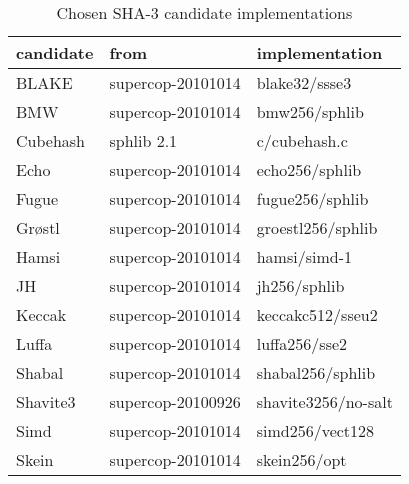 \begin{table}
  \centering
  \caption{Chosen \ac{SHA}-3 candidate implementations}
  \begin{tabular}{ | l | l | l | }
    \hline
    \textbf{candidate} & \textbf{from} & \textbf{implementation} \\ \hline
     BLAKE      & supercop-20101014 & blake32/ssse3     \\ \hline
     \ac{BMW}   & supercop-20101014 & bmw256/sphlib     \\ \hline
     Cubehash   & sphlib 2.1        & c/cubehash.c      \\ \hline
     Echo       & supercop-20101014 & echo256/sphlib    \\ \hline
     Fugue      & supercop-20101014 & fugue256/sphlib   \\ \hline
     Grøstl     & supercop-20101014 & groestl256/sphlib \\ \hline
     Hamsi      & supercop-20101014 & hamsi/simd-1      \\ \hline
     JH         & supercop-20101014 & jh256/sphlib      \\ \hline
     Keccak     & supercop-20101014 & keccakc512/sseu2  \\ \hline
     Luffa      & supercop-20101014 & luffa256/sse2     \\ \hline
     Shabal     & supercop-20101014 & shabal256/sphlib  \\ \hline
     Shavite3   & supercop-20100926 & shavite3256/no-salt       \\ \hline
     Simd       & supercop-20101014 & simd256/vect128   \\ \hline
     Skein      & supercop-20101014 & skein256/opt      \\ \hline
  \end{tabular}
  \label{tbl:sha3:implementations}
\end{table}
